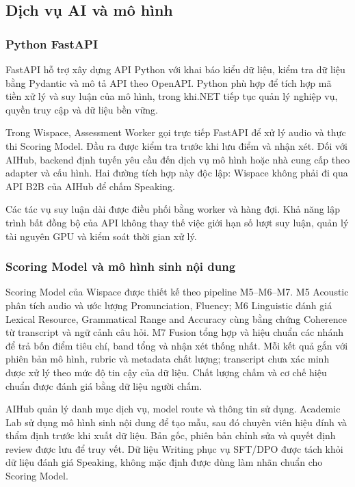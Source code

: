 \subsection{Dịch vụ AI và mô hình}
\subsubsection{Python FastAPI}

FastAPI hỗ trợ xây dựng API Python với khai báo kiểu dữ liệu, kiểm tra dữ liệu bằng Pydantic và mô tả API theo OpenAPI. Python phù hợp để tích hợp mã tiền xử lý và suy luận của mô hình, trong khi.NET tiếp tục quản lý nghiệp vụ, quyền truy cập và dữ liệu bền vững.

Trong Wispace, Assessment Worker gọi trực tiếp FastAPI để xử lý audio và thực thi Scoring Model. Đầu ra được kiểm tra trước khi lưu điểm và nhận xét. Đối với AIHub, backend định tuyến yêu cầu đến dịch vụ mô hình hoặc nhà cung cấp theo adapter và cấu hình. Hai đường tích hợp này độc lập: Wispace không phải đi qua API B2B của AIHub để chấm Speaking.

Các tác vụ suy luận dài được điều phối bằng worker và hàng đợi. Khả năng lập trình bất đồng bộ của API không thay thế việc giới hạn số lượt suy luận, quản lý tài nguyên GPU và kiểm soát thời gian xử lý.

\subsubsection{Scoring Model và mô hình sinh nội dung}

Scoring Model của Wispace được thiết kế theo pipeline M5--M6--M7. M5 Acoustic phân tích audio và ước lượng Pronunciation, Fluency; M6 Linguistic đánh giá Lexical Resource, Grammatical Range and Accuracy cùng bằng chứng Coherence từ transcript và ngữ cảnh câu hỏi. M7 Fusion tổng hợp và hiệu chuẩn các nhánh để trả bốn điểm tiêu chí, band tổng và nhận xét thống nhất. Mỗi kết quả gắn với phiên bản mô hình, rubric và metadata chất lượng; transcript chưa xác minh được xử lý theo mức độ tin cậy của dữ liệu. Chất lượng chấm và cơ chế hiệu chuẩn được đánh giá bằng dữ liệu người chấm.

AIHub quản lý danh mục dịch vụ, model route và thông tin sử dụng. Academic Lab sử dụng mô hình sinh nội dung để tạo mẫu, sau đó chuyên viên hiệu đính và thẩm định trước khi xuất dữ liệu. Bản gốc, phiên bản chỉnh sửa và quyết định review được lưu để truy vết. Dữ liệu Writing phục vụ SFT/DPO được tách khỏi dữ liệu đánh giá Speaking, không mặc định được dùng làm nhãn chuẩn cho Scoring Model.

